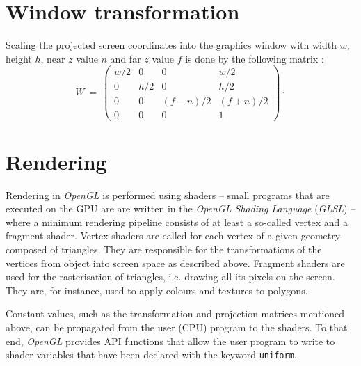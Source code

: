 \section{Window transformation}
\label{sec:gl_viewport}
Scaling the projected screen coordinates into the graphics window with width $w$, height $h$, near
$z$ value $n$ and far $z$ value $f$ is done by the following matrix \cite{web_gl_viewport}:
\begin{equation}
	W \ =\ 
	\left( \begin{array}{cccc} 
		w/2 &   0 &                  0 &                w/2 \\
		  0 & h/2 &                  0 &                h/2 \\
		  0 &   0 & \left(f-n\right)/2 & \left(f+n\right)/2 \\
		  0 &   0 &                  0 &                  1
	\end{array} \right) \cdot
\end{equation}



\section{Rendering}
\label{sec:gl_shaders}
Rendering in \textit{OpenGL} is performed using shaders -- small programs that are executed on 
the GPU are are written in the \textit{OpenGL Shading Language} (\textit{GLSL}) \cite{wiki_glsl} -- 
where a minimum rendering pipeline consists of at least a so-called vertex and a fragment shader. 
Vertex shaders are called for each vertex of a given geometry composed of triangles.
They are responsible for the transformations of the vertices from object into screen space as described above.
Fragment shaders are used for the rasterisation of triangles, i.e. drawing all its pixels on the screen. 
They are, for instance, used to apply colours and textures to polygons.

Constant values, such as the transformation and projection matrices mentioned above, can be propagated from the 
user (CPU) program to the shaders. To that end, \textit{OpenGL} provides API functions that allow the user 
program to write to shader variables that have been declared with the keyword \lstinline[language=C]|uniform|.

